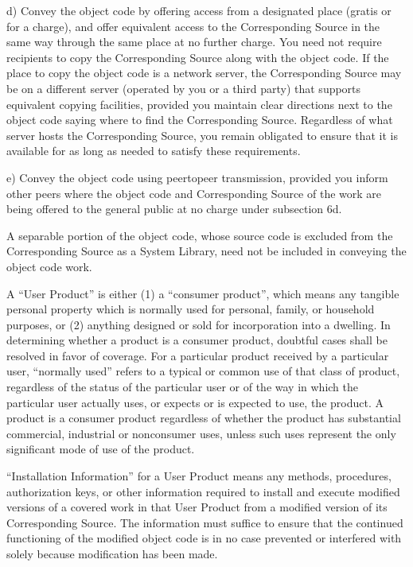 \documentclass[letterpaper,10pt,english]{sphinxmanual}
\begin{document}
\begin{sphinxVerbatim}[commandchars=\\\{\}]
   d) Convey the object code by offering access from a designated place (gratis
      or for a charge), and offer equivalent access to the Corresponding Source
      in the same way through the same place at no further charge. You need not
      require recipients to copy the Corresponding Source along with the object
      code. If the place to copy the object code is a network server, the
      Corresponding Source may be on a different server (operated by you or a
      third party) that supports equivalent copying facilities, provided you
      maintain clear directions next to the object code saying where to find
      the Corresponding Source. Regardless of what server hosts the
      Corresponding Source, you remain obligated to ensure that it is available
      for as long as needed to satisfy these requirements.

   e) Convey the object code using peer\PYGZhy{}to\PYGZhy{}peer transmission, provided you
      inform other peers where the object code and Corresponding Source of the
      work are being offered to the general public at no charge under
      subsection 6d.

   A separable portion of the object code, whose source code is excluded from
   the Corresponding Source as a System Library, need not be included in
   conveying the object code work.

   A “User Product” is either (1) a “consumer product”, which means any
   tangible personal property which is normally used for personal, family, or
   household purposes, or (2) anything designed or sold for incorporation into
   a dwelling. In determining whether a product is a consumer product, doubtful
   cases shall be resolved in favor of coverage. For a particular product
   received by a particular user, “normally used” refers to a typical or common
   use of that class of product, regardless of the status of the particular
   user or of the way in which the particular user actually uses, or expects or
   is expected to use, the product. A product is a consumer product regardless
   of whether the product has substantial commercial, industrial or
   non\PYGZhy{}consumer uses, unless such uses represent the only significant mode of
   use of the product.

   “Installation Information” for a User Product means any methods, procedures,
   authorization keys, or other information required to install and execute
   modified versions of a covered work in that User Product from a modified
   version of its Corresponding Source. The information must suffice to ensure
   that the continued functioning of the modified object code is in no case
   prevented or interfered with solely because modification has been made.


\end{sphinxVerbatim}
\end{document}
